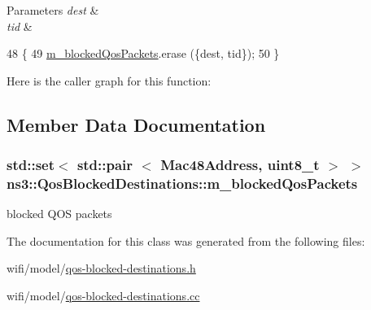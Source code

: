 \begin{DoxyParams}{Parameters}
{\em dest} & \\
\hline
{\em tid} & \\
\hline
\end{DoxyParams}

\begin{DoxyCode}
48 \{
49   \hyperlink{classns3_1_1QosBlockedDestinations_ad1cabb745db1b65e837d4f8725eff9ec}{m\_blockedQosPackets}.erase (\{dest, tid\});
50 \}
\end{DoxyCode}


Here is the caller graph for this function\+:




\subsection{Member Data Documentation}
\subsubsection[{\texorpdfstring{m\+\_\+blocked\+Qos\+Packets}{m_blockedQosPackets}}]{\setlength{\rightskip}{0pt plus 5cm}std\+::set$<$ std\+::pair $<$ {\bf Mac48\+Address}, uint8\+\_\+t $>$ $>$ ns3\+::\+Qos\+Blocked\+Destinations\+::m\+\_\+blocked\+Qos\+Packets\hspace{0.3cm}{\ttfamily [private]}}\hypertarget{classns3_1_1QosBlockedDestinations_ad1cabb745db1b65e837d4f8725eff9ec}{}\label{classns3_1_1QosBlockedDestinations_ad1cabb745db1b65e837d4f8725eff9ec}


blocked Q\+OS packets 



The documentation for this class was generated from the following files\+:\begin{DoxyCompactItemize}
\item 
wifi/model/\hyperlink{qos-blocked-destinations_8h}{qos-\/blocked-\/destinations.\+h}\item 
wifi/model/\hyperlink{qos-blocked-destinations_8cc}{qos-\/blocked-\/destinations.\+cc}\end{DoxyCompactItemize}
